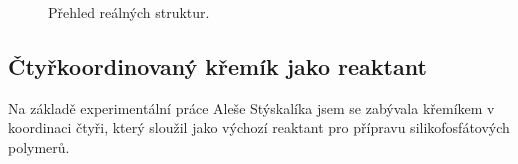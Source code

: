 \documentclass[
  digital, %
  table,   %
  lof,     %
  lot,     %
  oneside,
]{fithesis3}
\begin{document}
\begin{figure}
\begin{center}
\caption{Přehled reálných struktur.}
\label{prehled_real_structures}
\end{center}
\end{figure}
\subsection{Čtyřkoordinovaný křemík jako reaktant}
Na základě experimentální práce Aleše Stýskalíka jsem se zabývala křemíkem v koordinaci čtyři, který sloužil jako výchozí reaktant pro přípravu silikofosfátových polymerů.
\end{document}
